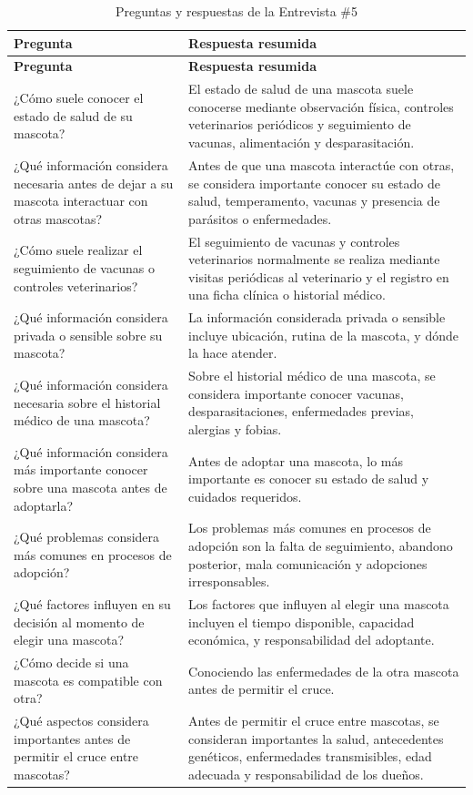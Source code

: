\documentclass[journal,onecolumn]{IEEEtran}
\begin{document}
\begin{longtable}{|p{7.5cm}|p{7.5cm}|}
\caption{Preguntas y respuestas de la Entrevista \#5}
\label{tab:pr_e5}\\
\hline
\textbf{Pregunta} & \textbf{Respuesta resumida} \\
\hline
\endfirsthead
\hline
\textbf{Pregunta} & \textbf{Respuesta resumida} \\
\hline
\endhead
¿Cómo suele conocer el estado de salud de su mascota? & El estado de salud de una mascota suele conocerse mediante observación física, controles veterinarios periódicos y seguimiento de vacunas, alimentación y desparasitación. \\
\hline
¿Qué información considera necesaria antes de dejar a su mascota interactuar con otras mascotas? & Antes de que una mascota interactúe con otras, se considera importante conocer su estado de salud, temperamento, vacunas y presencia de parásitos o enfermedades. \\
\hline
¿Cómo suele realizar el seguimiento de vacunas o controles veterinarios? & El seguimiento de vacunas y controles veterinarios normalmente se realiza mediante visitas periódicas al veterinario y el registro en una ficha clínica o historial médico. \\
\hline
¿Qué información considera privada o sensible sobre su mascota? & La información considerada privada o sensible incluye ubicación, rutina de la mascota, y dónde la hace atender. \\
\hline
¿Qué información considera necesaria sobre el historial médico de una mascota? & Sobre el historial médico de una mascota, se considera importante conocer vacunas, desparasitaciones, enfermedades previas, alergias y fobias. \\
\hline
¿Qué información considera más importante conocer sobre una mascota antes de adoptarla? & Antes de adoptar una mascota, lo más importante es conocer su estado de salud y cuidados requeridos. \\
\hline
¿Qué problemas considera más comunes en procesos de adopción? & Los problemas más comunes en procesos de adopción son la falta de seguimiento, abandono posterior, mala comunicación y adopciones irresponsables. \\
\hline
¿Qué factores influyen en su decisión al momento de elegir una mascota? & Los factores que influyen al elegir una mascota incluyen el tiempo disponible, capacidad económica, y responsabilidad del adoptante. \\
\hline
¿Cómo decide si una mascota es compatible con otra? & Conociendo las enfermedades de la otra mascota antes de permitir el cruce. \\
\hline
¿Qué aspectos considera importantes antes de permitir el cruce entre mascotas? & Antes de permitir el cruce entre mascotas, se consideran importantes la salud, antecedentes genéticos, enfermedades transmisibles, edad adecuada y responsabilidad de los dueños. \\
\hline
\end{longtable}
\end{document}
